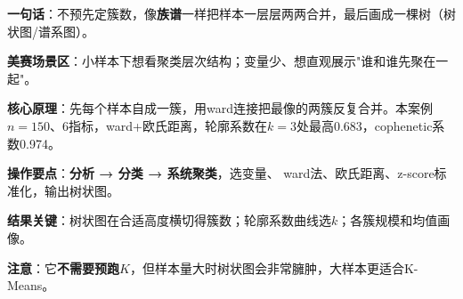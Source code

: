 
\begin{algobrief}
\textbf{一句话}：不预先定簇数，像\textbf{族谱}一样把样本一层层两两合并，最后画成一棵树（树状图/谱系图）。

\textbf{美赛场景区}：小样本下想看聚类层次结构；变量少、想直观展示"谁和谁先聚在一起"。

\textbf{核心原理}：先每个样本自成一簇，用ward连接把最像的两簇反复合并。本案例$n=150$、6指标，ward+欧氏距离，轮廓系数在$k=3$处最高0.683，cophenetic系数0.974。

\textbf{操作要点}：\textbf{分析 → 分类 → 系统聚类}，选变量、 ward法、欧氏距离、z-score标准化，输出树状图。

\textbf{结果关键}：树状图在合适高度横切得簇数；轮廓系数曲线选$k$；各簇规模和均值画像。

\textbf{注意}：它\textbf{不需要预跑$K$}，但样本量大时树状图会非常臃肿，大样本更适合K-Means。
\end{algobrief}
